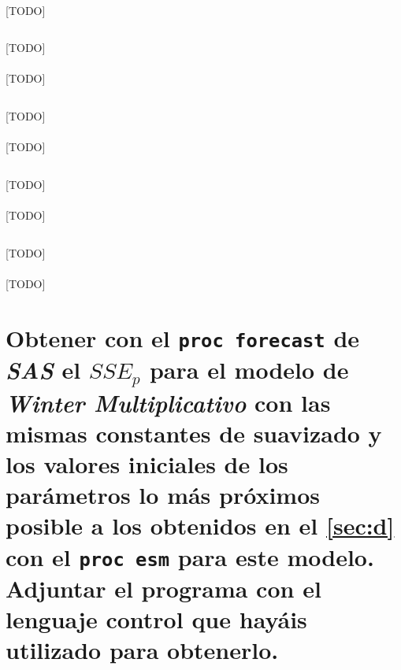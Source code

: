 \documentclass[a4paper, spanish]{article}
\begin{document}
    \paragraph{}
    [TODO]

    \begin{listing}[htb!]
      \centering
      \inputminted{SAS}{./res/code/d-02-prediction-error-esm-seasonal.sas}
      \caption{[TODO]}
      \label{code:d_prediction_error_esm_seasonal}
    \end{listing}

    \paragraph{}
    [TODO]

    \begin{listing}[htb!]
      \centering
      \inputminted{SAS}{./res/code/d-02-prediction-error-esm-winteradd.sas}
      \caption{[TODO]}
      \label{code:d_prediction_error_esm_winteradd}
    \end{listing}

    \paragraph{}
    [TODO]

    \begin{listing}[htb!]
      \centering
      \inputminted{SAS}{./res/code/d-02-prediction-error-esm-wintermul.sas}
      \caption{[TODO]}
      \label{code:d_prediction_error_esm_wintermul}
    \end{listing}

    \paragraph{}
    [TODO]

    \begin{listing}[htb!]
      \centering
      \inputminted{SAS}{./res/code/d-03-error-summary.sas}
      \caption{[TODO]}
      \label{code:d_summary_error}
    \end{listing}

    \paragraph{}
    [TODO]

  \section{Obtener con el \texttt{proc forecast} de \emph{SAS} el $SSE_p$ para el modelo de \emph{Winter Multiplicativo} con las mismas constantes de suavizado y los valores iniciales de los parámetros lo más próximos posible a los obtenidos en el \autoref{sec:d} con el \texttt{proc esm} para este modelo. Adjuntar el programa con el lenguaje control que hayáis utilizado para obtenerlo.}
  \label{sec:e}
\end{document}
